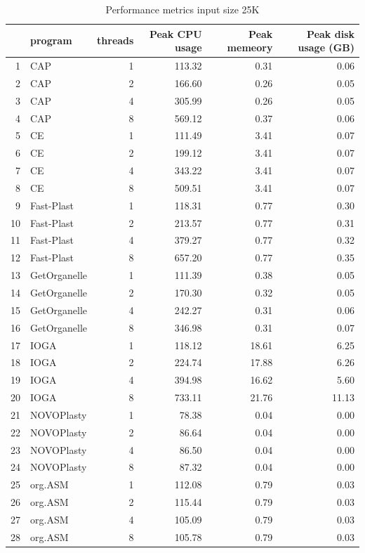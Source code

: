 \documentclass{bmcart}
\begin{document}
\begin{backmatter}
    






\begin{table}[ht]
\caption{Performance metrics input size 25K}
\label{tab:perform25K}
\centering
\begin{tabular}{rlrrrr}
  \hline
 & program & threads & Peak CPU usage & Peak memeory & Peak disk usage (GB) \\ 
  \hline
1 & CAP &   1 & 113.32 & 0.31 & 0.06 \\ 
  2 & CAP &   2 & 166.60 & 0.26 & 0.05 \\ 
  3 & CAP &   4 & 305.99 & 0.26 & 0.05 \\ 
  4 & CAP &   8 & 569.12 & 0.37 & 0.06 \\ 
  5 & CE &   1 & 111.49 & 3.41 & 0.07 \\ 
  6 & CE &   2 & 199.12 & 3.41 & 0.07 \\ 
  7 & CE &   4 & 343.22 & 3.41 & 0.07 \\ 
  8 & CE &   8 & 509.51 & 3.41 & 0.07 \\ 
  9 & Fast-Plast &   1 & 118.31 & 0.77 & 0.30 \\ 
  10 & Fast-Plast &   2 & 213.57 & 0.77 & 0.31 \\ 
  11 & Fast-Plast &   4 & 379.27 & 0.77 & 0.32 \\ 
  12 & Fast-Plast &   8 & 657.20 & 0.77 & 0.35 \\ 
  13 & GetOrganelle &   1 & 111.39 & 0.38 & 0.05 \\ 
  14 & GetOrganelle &   2 & 170.30 & 0.32 & 0.05 \\ 
  15 & GetOrganelle &   4 & 242.27 & 0.31 & 0.06 \\ 
  16 & GetOrganelle &   8 & 346.98 & 0.31 & 0.07 \\ 
  17 & IOGA &   1 & 118.12 & 18.61 & 6.25 \\ 
  18 & IOGA &   2 & 224.74 & 17.88 & 6.26 \\ 
  19 & IOGA &   4 & 394.98 & 16.62 & 5.60 \\ 
  20 & IOGA &   8 & 733.11 & 21.76 & 11.13 \\ 
  21 & NOVOPlasty &   1 & 78.38 & 0.04 & 0.00 \\ 
  22 & NOVOPlasty &   2 & 86.64 & 0.04 & 0.00 \\ 
  23 & NOVOPlasty &   4 & 86.50 & 0.04 & 0.00 \\ 
  24 & NOVOPlasty &   8 & 87.32 & 0.04 & 0.00 \\ 
  25 & org.ASM &   1 & 112.08 & 0.79 & 0.03 \\ 
  26 & org.ASM &   2 & 115.44 & 0.79 & 0.03 \\ 
  27 & org.ASM &   4 & 105.09 & 0.79 & 0.03 \\ 
  28 & org.ASM &   8 & 105.78 & 0.79 & 0.03 \\ 
   \hline
\end{tabular}
\end{table}


\end{backmatter}
\end{document}
